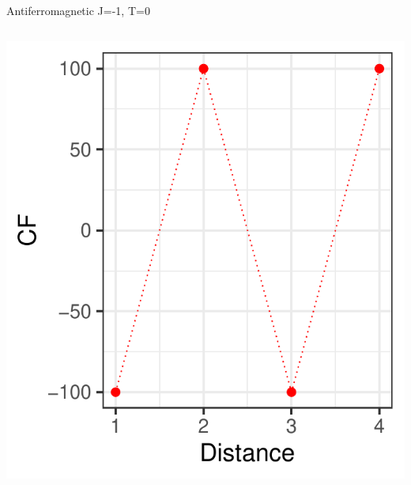 \documentclass{beamer}
\begin{document}
\begin{frame}{Antiferromagnetic J=-1, T=0}
\begin{columns}
\begin{column}{0.5\textwidth}
\begin{center}
     \includegraphics[width=\textwidth]{Pic/J-1_10_6000_T=0_CORRELATION.pdf}
     \end{center}
\end{column}
\end{columns}
\end{frame}
\end{document}

